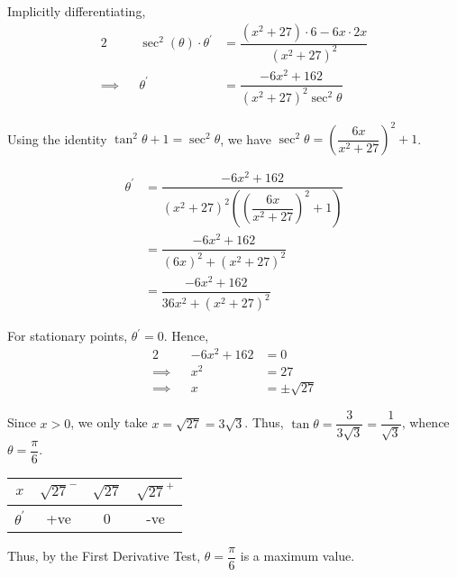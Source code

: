\documentclass{jhwhw}
\begin{document}
            Implicitly differentiating,
            \begin{alignat*}{2}
                &&\sec^2(\theta)\cdot\theta^\prime &= \dfrac{(x^2+27)\cdot 6 - 6x \cdot 2x}{(x^2+27)^2}\\
                \implies&&\theta^\prime&=\dfrac{-6x^2 + 162}{(x^2+27)^2\sec^2\theta}
            \end{alignat*}

            Using the identity $\tan^2 \theta + 1 = \sec^2\theta$, we have $\sec^2\theta = \left(\dfrac{6x}{x^2+27}\right)^2 + 1$.

            \begin{align*}
                \theta^\prime &= \dfrac{-6x^2 + 162}{(x^2+27)^2\left(\left(\dfrac{6x}{x^2+27}\right)^2 + 1\right)}\\
                &= \dfrac{-6x^2 + 162}{(6x)^2 + \left(x^2+27\right)^2}\\
                &= \dfrac{-6x^2 + 162}{36x^2 + \left(x^2+27\right)^2}
            \end{align*}

            For stationary points, $\theta^\prime = 0$. Hence,
            \begin{alignat*}{2}
                &&-6x^2 + 162 &= 0\\
                \implies&&x^2 &= 27\\
                \implies&&x &= \pm \sqrt{27}
            \end{alignat*}

            Since $x > 0$, we only take $x = \sqrt{27}=3\sqrt{3}$. Thus, $\tan\theta = \dfrac3{3\sqrt{3}} = \dfrac1{\sqrt3}$, whence $\theta = \dfrac{\pi}{6}$.


            \begin{table}[h]
                \centering
                \begin{tabular}{|c|c|c|c|}
                \hline
                $x$ & $\sqrt{27}^-$ & $\sqrt{27}$ & $\sqrt{27}^+$ \\\hline
                $\theta^\prime$ & +ve   & 0 & -ve   \\\hline
                \end{tabular}
            \end{table}

            Thus, by the First Derivative Test, $\theta = \dfrac{\pi}6$ is a maximum value.
\end{document}
